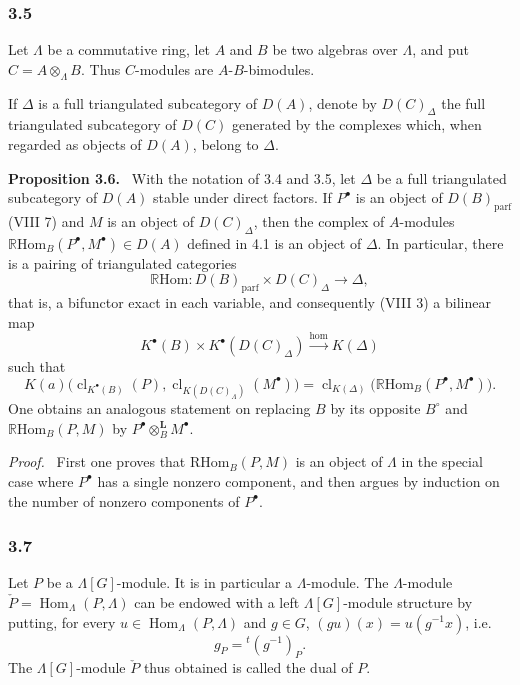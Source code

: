 \documentclass[11pt]{article}
\newenvironment{statement}[1]{\par\medskip\noindent\textbf{#1.}\ }{\par\medskip}
\newenvironment{prooftext}[1][Proof]{\par\noindent\emph{#1.}\ }{\par\medskip}
\DeclareMathOperator{\Hom}{Hom}
\providecommand{\RHom}{\mathrm{RHom}}
\providecommand{\cl}{\operatorname{cl}}
\providecommand{\parf}{\mathrm{parf}}
\providecommand{\RHom}{\mathrm{RHom}}
\providecommand{\Hom}{\operatorname{Hom}}
\providecommand{\RHom}{\mathrm R\mathcal{H}om}
\providecommand{\cl}{\operatorname{cl}}
\providecommand{\parf}{\mathrm{parf}}
\providecommand{\RHom}{\mathrm{RHom}}
\providecommand{\Hom}{\operatorname{Hom}}
\providecommand{\cl}{\operatorname{cl}}
\begin{document}
\subsubsection*{3.5}

Let $\Lambda$ be a commutative ring, let $A$ and $B$ be two algebras over $\Lambda$, and put $C=A\otimes_\Lambda B$. Thus $C$-modules are $A$-$B$-bimodules.

If $\Delta$ is a full triangulated subcategory of $D(A)$, denote by $D(C)_{\Delta}$ the full triangulated subcategory of $D(C)$ generated by the complexes which, when regarded as objects of $D(A)$, belong to $\Delta$.

\begin{statement}{Proposition 3.6}
With the notation of 3.4 and 3.5, let $\Delta$ be a full triangulated subcategory of $D(A)$ stable under direct factors. If $P^\bullet$ is an object of $D(B)_{\parf}$ (VIII 7) and $M$ is an object of $D(C)_{\Delta}$, then the complex of $A$-modules $\mathbb{R}\mathrm{Hom}_B(P^\bullet,M^\bullet)\in D(A)$ defined in 4.1 is an object of $\Delta$. In particular, there is a pairing of triangulated categories
\[
\mathbb{R}\mathrm{Hom}:D(B)_{\parf}\times D(C)_{\Delta}\longrightarrow \Delta,
\tag{3.6.1}
\]
that is, a bifunctor exact in each variable, and consequently (VIII 3) a bilinear map
\[
K^{\bullet}(B)\times K^{\bullet}(D(C)_{\Delta})\xrightarrow{\operatorname{hom}} K(\Delta)
\tag{3.6.2}
\]
such that
\[
K(a)\bigl(\cl_{K^{\bullet}(B)}(P),\cl_{K(D(C)_{\Lambda})}(M^\bullet)\bigr)
=\cl_{K(\Delta)}\bigl(\mathbb{R}\mathrm{Hom}_B(P^\bullet,M^\bullet)\bigr).
\tag{3.6.3}
\]
One obtains an analogous statement on replacing $B$ by its opposite $B^\circ$ and $\mathbb{R}\mathrm{Hom}_B(P,M)$ by $P^\bullet\otimes_B^{\mathbf L}M^\bullet$.
\end{statement}

\begin{prooftext}[Proof]
First one proves that $\RHom_B(P,M)$ is an object of $\Lambda$ in the special case where $P^\bullet$ has a single nonzero component, and then argues by induction on the number of nonzero components of $P^\bullet$.
\end{prooftext}

\subsubsection*{3.7}

Let $P$ be a $\Lambda[G]$-module. It is in particular a $\Lambda$-module. The $\Lambda$-module $\check P=\Hom_\Lambda(P,\Lambda)$ can be endowed with a left $\Lambda[G]$-module structure by putting, for every $u\in\Hom_\Lambda(P,\Lambda)$ and $g\in G$, $(gu)(x)=u(g^{-1}x)$, i.e.
\[
g_{ P}={}^{t}(g^{-1})_P.
\tag{3.7.1}
\]
The $\Lambda[G]$-module $\check P$ thus obtained is called the dual of $P$.
\end{document}
